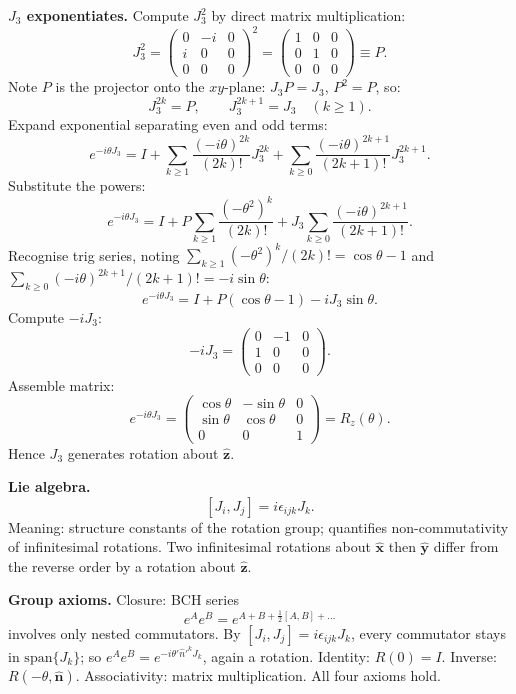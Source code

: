 \documentclass[11pt]{article}
\begin{document}
\textbf{$J_3$ exponentiates.} Compute $J_3^2$ by direct matrix multiplication:
\[ J_3^2 = \begin{pmatrix}0&-i&0\\ i&0&0\\ 0&0&0\end{pmatrix}^2 = \begin{pmatrix}1&0&0\\ 0&1&0\\ 0&0&0\end{pmatrix} \equiv P. \]
Note $P$ is the projector onto the $xy$-plane: $J_3 P = J_3$, $P^2 = P$, so:
\[ J_3^{2k}=P,\qquad J_3^{2k+1}=J_3\quad (k\ge 1). \]
Expand exponential separating even and odd terms:
\[ e^{-i\theta J_3} = I + \sum_{k\ge 1}\frac{(-i\theta)^{2k}}{(2k)!}J_3^{2k} + \sum_{k\ge 0}\frac{(-i\theta)^{2k+1}}{(2k+1)!}J_3^{2k+1}. \]
Substitute the powers:
\[ e^{-i\theta J_3} = I + P\sum_{k\ge 1}\frac{(-\theta^2)^{k}}{(2k)!} + J_3\sum_{k\ge 0}\frac{(-i\theta)^{2k+1}}{(2k+1)!}. \]
Recognise trig series, noting $\sum_{k\ge 1}(-\theta^2)^k/(2k)! = \cos\theta - 1$ and $\sum_{k\ge 0}(-i\theta)^{2k+1}/(2k+1)! = -i\sin\theta$:
\[ e^{-i\theta J_3} = I + P(\cos\theta - 1) - i J_3\sin\theta. \]
Compute $-iJ_3$:
\[ -iJ_3 = \begin{pmatrix}0&-1&0\\ 1&0&0\\ 0&0&0\end{pmatrix}. \]
Assemble matrix:
\[ e^{-i\theta J_3} = \begin{pmatrix}\cos\theta & -\sin\theta & 0\\ \sin\theta & \cos\theta & 0\\ 0 & 0 & 1\end{pmatrix} = R_z(\theta). \]
Hence $J_3$ generates rotation about $\hat{\bm z}$.

\textbf{Lie algebra.}
\[ [J_i,J_j] = i\epsilon_{ijk}J_k. \]
Meaning: structure constants of the rotation group; quantifies non-commutativity of infinitesimal rotations. Two infinitesimal rotations about $\hat{\bm x}$ then $\hat{\bm y}$ differ from the reverse order by a rotation about $\hat{\bm z}$.

\textbf{Group axioms.} Closure: BCH series
\[ e^A e^B = e^{A+B+\tfrac12[A,B]+\dots} \]
involves only nested commutators. By $[J_i,J_j]=i\epsilon_{ijk}J_k$, every commutator stays in $\mathrm{span}\{J_k\}$; so $e^A e^B = e^{-i\theta'\hat n'^k J_k}$, again a rotation. Identity: $R(0)=I$. Inverse: $R(-\theta,\hat{\bm n})$. Associativity: matrix multiplication. All four axioms hold.
\end{document}
